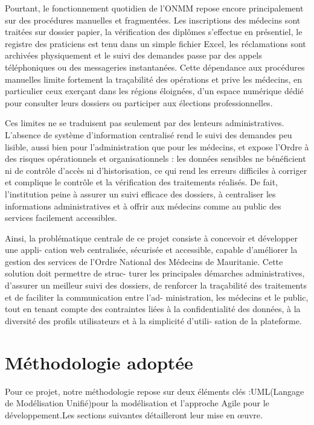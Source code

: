 ﻿\documentclass[12pt,a4paper]{report}
\begin{document}
Pourtant, le fonctionnement quotidien de l’ONMM repose encore principalement sur des procédures manuelles et fragmentées. Les inscriptions des médecins sont traitées sur dossier papier, la vérification des diplômes s’effectue en présentiel, le registre des praticiens est tenu dans un simple fichier Excel, les réclamations sont archivées physiquement et le suivi des demandes passe par des appels téléphoniques ou des messageries instantanées. Cette dépendance aux procédures manuelles limite fortement la traçabilité des opérations et prive les médecins, en particulier ceux exerçant dans les régions éloignées, d’un espace numérique dédié pour consulter leurs dossiers ou participer aux élections professionnelles.

Ces limites ne se traduisent pas seulement par des lenteurs administratives. L’absence de système d’information centralisé rend le suivi des demandes peu lisible, aussi bien pour l’administration que pour les médecins, et expose l’Ordre à des risques opérationnels et organisationnels : les données sensibles ne bénéficient ni de contrôle d’accès ni d’historisation, ce qui rend les erreurs difficiles à corriger et complique le contrôle et la vérification des traitements réalisés. De fait, l’institution peine à assurer un suivi efficace des dossiers, à centraliser les informations administratives et à offrir aux médecins comme au public des services facilement accessibles.

Ainsi, la problématique centrale de ce projet consiste à concevoir et développer une appli-
cation web centralisée, sécurisée et accessible, capable d’améliorer la gestion des services
de l’Ordre National des Médecins de Mauritanie. Cette solution doit permettre de struc-
turer les principales démarches administratives, d’assurer un meilleur suivi des dossiers,
de renforcer la traçabilité des traitements et de faciliter la communication entre l’ad-
ministration, les médecins et le public, tout en tenant compte des contraintes liées à la
confidentialité des données, à la diversité des profils utilisateurs et à la simplicité d’utili-
sation de la plateforme.

\section{Méthodologie adoptée}

Pour ce projet, notre méthodologie repose sur deux éléments clés :UML(Langage de
Modélisation Unifié)pour la modélisation et l'approche Agile pour le développement.Les
sections suivantes détailleront leur mise en œuvre.
\end{document}
